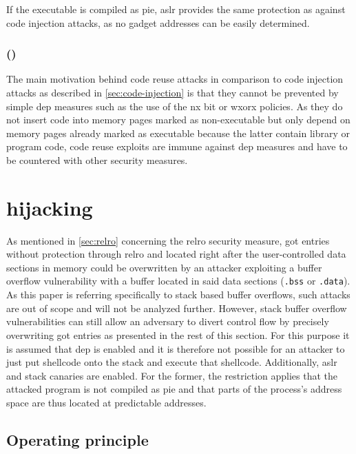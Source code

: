 If the executable is compiled as \gls{pie}, \gls{aslr} provides the same protection as against code injection attacks, as no gadget addresses can be easily determined.

\subsubsection{ ()}
\label{subsubsec:cr-dep}

The main motivation behind code reuse attacks in comparison to code injection attacks as described in \cref{sec:code-injection} is that they cannot be prevented by simple \gls{dep} measures such as the use of the \gls{nx} bit or \gls{wxorx} policies.
As they do not insert code into memory pages marked as non-executable but only depend on memory pages already marked as executable because the latter contain library or program code, code reuse exploits are immune against \gls{dep} measures and have to be countered with other security measures.

\section{ hijacking}
\label{sec:got-hijacking}

As mentioned in \cref{sec:relro} concerning the \gls{relro} security measure, \gls{got} entries without protection through \gls{relro} and located right after the user-controlled data sections in memory could be overwritten by an attacker exploiting a buffer overflow vulnerability with a buffer located in said data sections (\texttt{.bss} or \texttt{.data}).
As this paper is referring specifically to stack based buffer overflows, such attacks are out of scope and will not be analyzed further.
However, stack buffer overflow vulnerabilities can still allow an adversary to divert control flow by precisely overwriting \gls{got} entries as presented in the rest of this section.
For this purpose it is assumed that \gls{dep} is enabled and it is therefore not possible for an attacker to just put shellcode onto the stack and execute that shellcode.
Additionally, \gls{aslr} and stack canaries are enabled.
For the former, the restriction applies that the attacked program is not compiled as \gls{pie} and that parts of the process's address space are thus located at predictable addresses.

\subsection{Operating principle}
\label{subsec:got-operating-principle}

